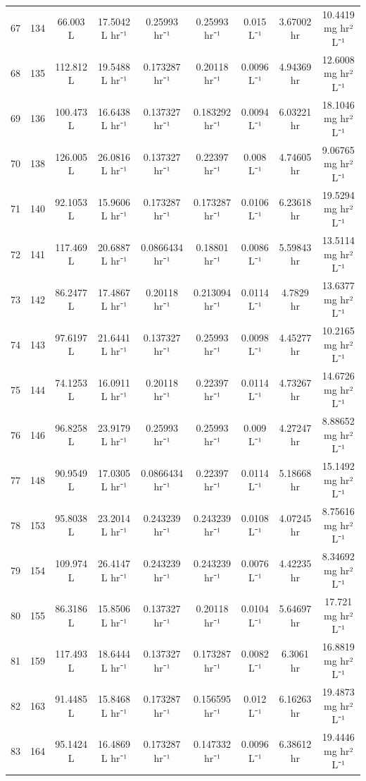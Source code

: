 \documentclass[12pt,a4paper]{article}
\begin{document}
\begin{tabular}{r|cccccccc}
	67 & 134 & 66.003 L & 17.5042 L hr⁻¹ & 0.25993 hr⁻¹ & 0.25993 hr⁻¹ & 0.015 L⁻¹ & 3.67002 hr & 10.4419 mg hr² L⁻¹ \\
	68 & 135 & 112.812 L & 19.5488 L hr⁻¹ & 0.173287 hr⁻¹ & 0.20118 hr⁻¹ & 0.0096 L⁻¹ & 4.94369 hr & 12.6008 mg hr² L⁻¹ \\
	69 & 136 & 100.473 L & 16.6438 L hr⁻¹ & 0.137327 hr⁻¹ & 0.183292 hr⁻¹ & 0.0094 L⁻¹ & 6.03221 hr & 18.1046 mg hr² L⁻¹ \\
	70 & 138 & 126.005 L & 26.0816 L hr⁻¹ & 0.137327 hr⁻¹ & 0.22397 hr⁻¹ & 0.008 L⁻¹ & 4.74605 hr & 9.06765 mg hr² L⁻¹ \\
	71 & 140 & 92.1053 L & 15.9606 L hr⁻¹ & 0.173287 hr⁻¹ & 0.173287 hr⁻¹ & 0.0106 L⁻¹ & 6.23618 hr & 19.5294 mg hr² L⁻¹ \\
	72 & 141 & 117.469 L & 20.6887 L hr⁻¹ & 0.0866434 hr⁻¹ & 0.18801 hr⁻¹ & 0.0086 L⁻¹ & 5.59843 hr & 13.5114 mg hr² L⁻¹ \\
	73 & 142 & 86.2477 L & 17.4867 L hr⁻¹ & 0.20118 hr⁻¹ & 0.213094 hr⁻¹ & 0.0114 L⁻¹ & 4.7829 hr & 13.6377 mg hr² L⁻¹ \\
	74 & 143 & 97.6197 L & 21.6441 L hr⁻¹ & 0.137327 hr⁻¹ & 0.25993 hr⁻¹ & 0.0098 L⁻¹ & 4.45277 hr & 10.2165 mg hr² L⁻¹ \\
	75 & 144 & 74.1253 L & 16.0911 L hr⁻¹ & 0.20118 hr⁻¹ & 0.22397 hr⁻¹ & 0.0114 L⁻¹ & 4.73267 hr & 14.6726 mg hr² L⁻¹ \\
	76 & 146 & 96.8258 L & 23.9179 L hr⁻¹ & 0.25993 hr⁻¹ & 0.25993 hr⁻¹ & 0.009 L⁻¹ & 4.27247 hr & 8.88652 mg hr² L⁻¹ \\
	77 & 148 & 90.9549 L & 17.0305 L hr⁻¹ & 0.0866434 hr⁻¹ & 0.22397 hr⁻¹ & 0.0114 L⁻¹ & 5.18668 hr & 15.1492 mg hr² L⁻¹ \\
	78 & 153 & 95.8038 L & 23.2014 L hr⁻¹ & 0.243239 hr⁻¹ & 0.243239 hr⁻¹ & 0.0108 L⁻¹ & 4.07245 hr & 8.75616 mg hr² L⁻¹ \\
	79 & 154 & 109.974 L & 26.4147 L hr⁻¹ & 0.243239 hr⁻¹ & 0.243239 hr⁻¹ & 0.0076 L⁻¹ & 4.42235 hr & 8.34692 mg hr² L⁻¹ \\
	80 & 155 & 86.3186 L & 15.8506 L hr⁻¹ & 0.137327 hr⁻¹ & 0.20118 hr⁻¹ & 0.0104 L⁻¹ & 5.64697 hr & 17.721 mg hr² L⁻¹ \\
	81 & 159 & 117.493 L & 18.6444 L hr⁻¹ & 0.137327 hr⁻¹ & 0.173287 hr⁻¹ & 0.0082 L⁻¹ & 6.3061 hr & 16.8819 mg hr² L⁻¹ \\
	82 & 163 & 91.4485 L & 15.8468 L hr⁻¹ & 0.173287 hr⁻¹ & 0.156595 hr⁻¹ & 0.012 L⁻¹ & 6.16263 hr & 19.4873 mg hr² L⁻¹ \\
	83 & 164 & 95.1424 L & 16.4869 L hr⁻¹ & 0.173287 hr⁻¹ & 0.147332 hr⁻¹ & 0.0096 L⁻¹ & 6.38612 hr & 19.4446 mg hr² L⁻¹ \\

\end{tabular}
\end{document}
